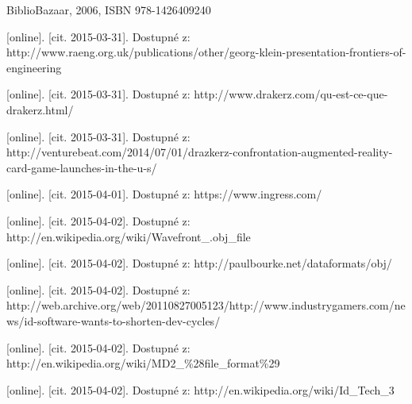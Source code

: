 \documentclass[twoside,12pt]{article}
\begin{document}
% 
% 
\begin{literatura}

 {
	BiblioBazaar, 2006, ISBN 978-1426409240
}


{
	 [online]. [cit. 2015-03-31]. Dostupné z: 		http://www.raeng.org.uk/publications/other/georg-klein-presentation-frontiers-of-engineering
}

{
	 [online]. [cit. 2015-03-31]. Dostupné z: http://www.drakerz.com/qu-est-ce-que-drakerz.html/
}

{
	 [online]. [cit. 2015-03-31]. Dostupné z: http://venturebeat.com/2014/07/01/drazkerz-confrontation-augmented-reality-card-game-launches-in-the-u-s/
}

{
	 [online]. [cit. 2015-04-01]. Dostupné z: https://www.ingress.com/
}

{
	 [online]. [cit. 2015-04-02]. Dostupné z: http://en.wikipedia.org/wiki/Wavefront\_.obj\_file
}

{
	 [online]. [cit. 2015-04-02]. Dostupné z: http://paulbourke.net/dataformats/obj/
}

{
	 [online]. [cit. 2015-04-02]. Dostupné z: http://web.archive.org/web/20110827005123/http://www.industrygamers.com/news/id-software-wants-to-shorten-dev-cycles/
}

{
	 [online]. [cit. 2015-04-02]. Dostupné z: http://en.wikipedia.org/wiki/MD2\_\%28file\_format\%29
}

{
	 [online]. [cit. 2015-04-02]. Dostupné z: http://en.wikipedia.org/wiki/Id\_Tech\_3
}


\end{literatura}
\end{document}
